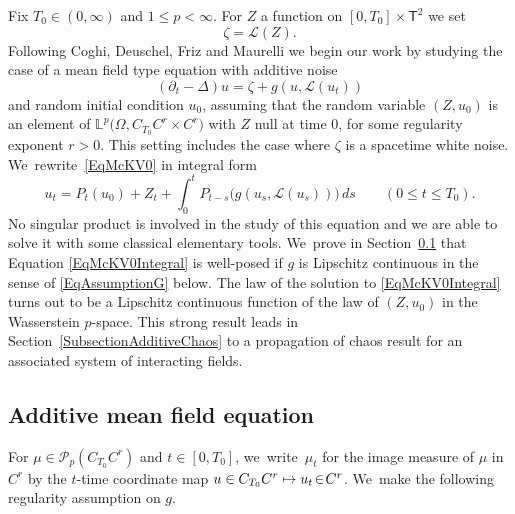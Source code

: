 \documentclass[JEP,XML,SOM,Unicode,published]{cedram}
\newcommand\mto{\mathchoice{\longmapsto}{\mapsto}{\mapsto}{\mapsto}}
\theoremstyle{definition}
\newcommand{\bsfT}{\mathbf{\mathsf{T}}}
\newcommand{\mcL}{\mathcal{L}}
\newcommand{\bbL}{\mathbb{L}}
\begin{document}
Fix $T_0\in(0,\infty)$ and $1\leq p<\infty$. For $Z$ a function on $[0,T_0]\times \bsfT^2$ we set
\[
\zeta = \mathscr{L}(Z).
\]
Following Coghi, Deuschel, Friz and Maurelli \cite{CDFM} we begin our work by studying the case of a mean field type equation with additive noise
\begin{equation} \label{EqMcKV0}
(\partial_t-\Delta)u = \zeta + g(u, \mcL(u_t))
\end{equation}
and random initial condition $u_0$, assuming that the random variable $(Z,u_0)$ is an element of $\bbL^p\bigl(\Omega, C_{T_0}C^r \times C^r\bigr)$ with $Z$ null at time $0$, for some regularity exponent \hbox{$r\!>\!0$}. This setting includes the case where $\zeta$ is a spacetime white noise. We~rewrite~\eqref{EqMcKV0} in integral form
\begin{equation} \label{EqMcKV0Integral}
u_t = P_t(u_0) + Z_t + \int_0^t P_{t-s} \bigl(g(u_s,\mcL(u_s))\bigr) \, ds \qquad (0\leq t\leq T_0).
\end{equation}
No singular product is involved in the study of this equation and we are able to solve it with some classical elementary tools. We~prove in Section~\ref{SubsectionAdditive} that Equation \eqref{EqMcKV0Integral} is well-posed if $g$ is Lipschitz continuous in the sense of \eqref{EqAssumptionG} below. The law of the solution to \eqref{EqMcKV0Integral} turns out to be a Lipschitz continuous function of the law of $(Z,u_0)$ in the Wasserstein $p$-space. This strong result leads in Section~\ref{SubsectionAdditiveChaos} to a propagation of chaos result for an associated system of interacting fields.

\subsection{Additive mean field equation}
\label{SubsectionAdditive}

For $\mu\!\in\!\mathcal{P}_p(C_{T_0}C^r)$ and $t\!\in\![0,T_0]$, we~write~$\mu_t$ for the image measure of $\mu$ in $C^r$ by the $t$-time coordinate map $u\in C_{T_0}C^r\mto u_t \!\in\! C^r$. We~make the following regularity assumption on $g$.
\end{document}
